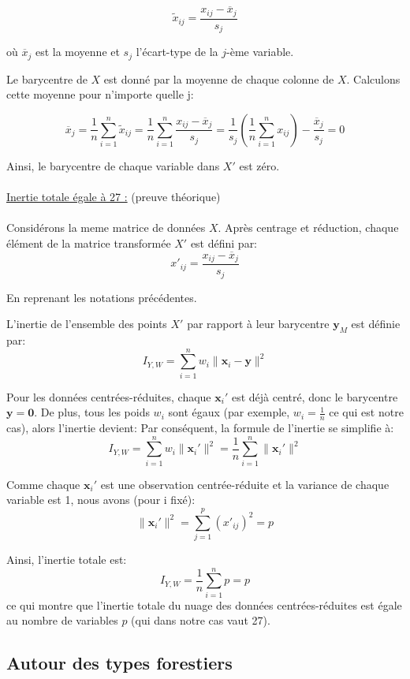 \documentclass{article}
\begin{document}
\[
\tilde{x}_{ij} = \frac{x_{ij} - \overline{x}_j}{s_j}
\]

où $\overline{x}_j$ est la moyenne et $s_j$ l'écart-type de la $j$-ème variable.


Le barycentre de $X$ est donné par la moyenne de chaque colonne de $X$. Calculons cette moyenne pour n'importe quelle j:

\[
\overline{x}_j = \frac{1}{n} \sum_{i=1}^n \tilde{x}_{ij} = \frac{1}{n} \sum_{i=1}^n \frac{x_{ij} - \overline{x}_j}{s_j} = \frac{1}{s_j} \left(\frac{1}{n} \sum_{i=1}^n x_{ij}\right) - \frac{\overline{x}_j}{s_j} = 0
\]

Ainsi, le barycentre de chaque variable dans $X'$ est zéro.
\\
\\

\underline{Inertie totale égale à 27 :} (preuve théorique)
\\
\\
Considérons la meme matrice de données $X$. Après centrage et réduction, chaque élément de la matrice transformée $X'$ est défini par:
\[
x'_{ij} = \frac{x_{ij} - \overline{x}_j}{s_j}
\]

En reprenant les notations précédentes.


L'inertie de l'ensemble des points $X'$ par rapport à leur barycentre $\mathbf{y}_M$ est définie par:
\[
I_{Y, W} = \sum_{i=1}^n w_i \|\mathbf{x}_i - \mathbf{y}\|^2
\]

Pour les données centrées-réduites, chaque $\mathbf{x}_i'$
est déjà centré, donc le barycentre $\mathbf{y} = \mathbf{0}$.
De plus, tous les poids $w_i$ sont égaux (par exemple, $w_i = \frac{1}{n}$ ce qui est notre cas), alors l'inertie devient:
Par conséquent, la formule de l'inertie se simplifie à:
\[
I_{Y, W} = \sum_{i=1}^n w_i \|\mathbf{x}_i'\|^2 = \frac{1}{n} \sum_{i=1}^n \|\mathbf{x}_i'\|^2 
\]

Comme chaque $\mathbf{x}_i'$ est une observation centrée-réduite et la variance de chaque variable est 1, nous avons (pour i fixé):
\[
\|\mathbf{x}_i'\|^2 = \sum_{j=1}^p (x'_{ij})^2 = p
\]

Ainsi, l'inertie totale est:
\[
I_{Y, W} = \frac{1}{n} \sum_{i=1}^n p = p 
\]
ce qui montre que l'inertie totale du nuage des données centrées-réduites est égale au nombre de variables $p$ (qui dans notre cas vaut 27).

\subsection{Autour des types forestiers}
\end{document}
